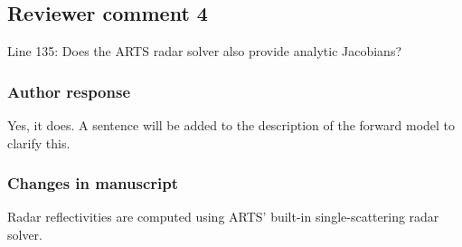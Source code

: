 %

\subsection*{Reviewer comment 4}
Line 135: Does the ARTS radar solver also provide analytic Jacobians?

\subsubsection*{Author response}

Yes, it does. A sentence will be added to the description of the forward model
to clarify this.

\subsubsection*{Changes in manuscript}
\begin{change}[146]
Radar reflectivities are computed using ARTS' built-in single-scattering radar
solver\DIFaddbegin {}\DIFaddend .
\end{change}

